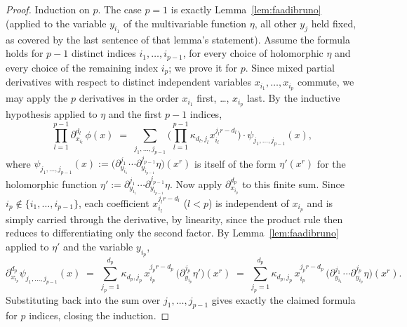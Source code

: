 \documentclass[10pt,a4paper]{amsart}
\begin{document}
\begin{proof}
Induction on $p$. The case $p=1$ is exactly Lemma~\ref{lem:faadibruno} (applied to the variable $y_{i_1}$ of the multivariable function $\eta$, all other $y_j$ held fixed, as covered by the last sentence of that lemma's statement). Assume the formula holds for $p-1$ distinct indices $i_1,\dots,i_{p-1}$, for every choice of holomorphic $\eta$ and every choice of the remaining index $i_p$; we prove it for $p$. Since mixed partial derivatives with respect to distinct independent variables $x_{i_1},\dots,x_{i_p}$ commute, we may apply the $p$ derivatives in the order $x_{i_1}$ first, \dots, $x_{i_p}$ last. By the inductive hypothesis applied to $\eta$ and the first $p-1$ indices,
\[
\prod_{l=1}^{p-1}\partial_{x_{i_l}}^{d_l}\,\phi(x) \;=\; \sum_{j_1,\dots,j_{p-1}} \Big(\prod_{l=1}^{p-1}\kappa_{d_l,j_l}x_{i_l}^{j_lr-d_l}\Big)\cdot \psi_{j_1,\dots,j_{p-1}}(x),
\]
where $\psi_{j_1,\dots,j_{p-1}}(x):=\big(\partial_{y_{i_1}}^{j_1}\cdots\partial_{y_{i_{p-1}}}^{j_{p-1}}\eta\big)(x^r)$ is itself of the form $\eta'(x^r)$ for the holomorphic function $\eta':=\partial_{y_{i_1}}^{j_1}\cdots\partial_{y_{i_{p-1}}}^{j_{p-1}}\eta$. Now apply $\partial_{x_{i_p}}^{d_p}$ to this finite sum. Since $i_p\notin\{i_1,\dots,i_{p-1}\}$, each coefficient $x_{i_l}^{j_lr-d_l}$ ($l<p$) is independent of $x_{i_p}$ and is simply carried through the derivative, by linearity, since the product rule then reduces to differentiating only the second factor. By Lemma~\ref{lem:faadibruno} applied to $\eta'$ and the variable $y_{i_p}$,
\[
\partial_{x_{i_p}}^{d_p}\psi_{j_1,\dots,j_{p-1}}(x) \;=\; \sum_{j_p=1}^{d_p} \kappa_{d_p,j_p}\,x_{i_p}^{j_pr-d_p}\,\big(\partial_{y_{i_p}}^{j_p}\eta'\big)(x^r) \;=\; \sum_{j_p=1}^{d_p} \kappa_{d_p,j_p}\,x_{i_p}^{j_pr-d_p}\,\big(\partial_{y_{i_1}}^{j_1}\cdots\partial_{y_{i_p}}^{j_p}\eta\big)(x^r).
\]
Substituting back into the sum over $j_1,\dots,j_{p-1}$ gives exactly the claimed formula for $p$ indices, closing the induction.
\end{proof}
\end{document}
